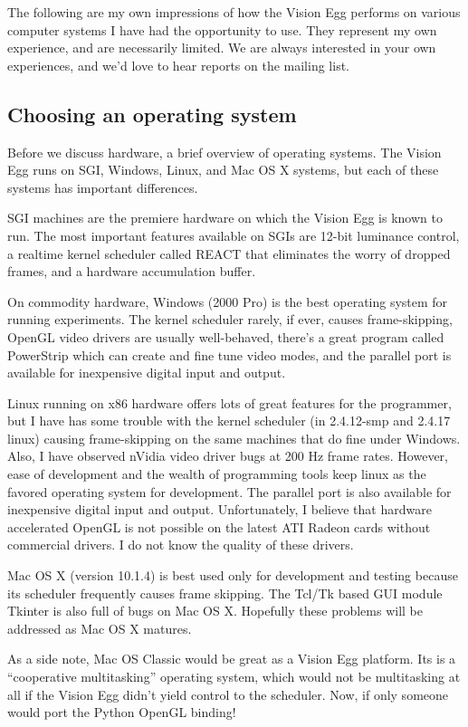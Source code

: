 The following are my own impressions of how the Vision Egg performs on
various computer systems I have had the opportunity to use. They
represent my own experience, and are necessarily limited.  We are
always interested in your own experiences, and we'd love to hear
reports on the mailing list.

\subsection{Choosing an operating system}

Before we discuss hardware, a brief overview of operating systems.
The Vision Egg runs on SGI, Windows, Linux, and Mac OS X systems, but
each of these systems has important differences.

SGI machines are the premiere hardware on which the Vision Egg is
known to run. The most important features available on SGIs are 12-bit
luminance control, a realtime kernel scheduler called REACT that
eliminates the worry of dropped frames, and a hardware accumulation
buffer.

On commodity hardware, Windows (2000 Pro) is the best operating system
for running experiments. The kernel scheduler rarely, if ever, causes
frame-skipping, OpenGL video drivers are usually well-behaved, there's
a great program called PowerStrip which can create and fine tune video
modes, and the parallel port is available for inexpensive digital
input and output.

Linux running on x86 hardware offers lots of great features for the
programmer, but I have has some trouble with the kernel scheduler (in
2.4.12-smp and 2.4.17 linux) causing frame-skipping on the same
machines that do fine under Windows. Also, I have observed nVidia
video driver bugs at 200 Hz frame rates. However, ease of development
and the wealth of programming tools keep linux as the favored
operating system for development. The parallel port is also available
for inexpensive digital input and output. Unfortunately, I believe
that hardware accelerated OpenGL is not possible on the latest ATI
Radeon cards without commercial drivers.  I do not know the quality of
these drivers.

Mac OS X (version 10.1.4) is best used only for development and
testing because its scheduler frequently causes frame skipping.  The
Tcl/Tk based GUI module Tkinter is also full of bugs on Mac OS
X. Hopefully these problems will be addressed as Mac OS X matures.

As a side note, Mac OS Classic would be great as a Vision Egg
platform. Its is a ``cooperative multitasking'' operating system,
which would not be multitasking at all if the Vision Egg didn't yield
control to the scheduler. Now, if only someone would port the Python
OpenGL binding!

